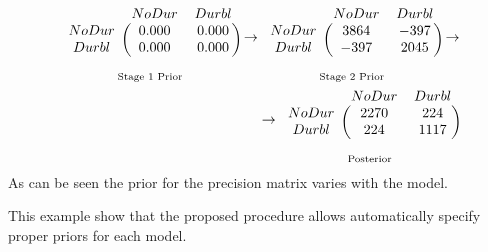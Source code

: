 \begin{eqnarray*}
\underset{\text{Stage 1 Prior}}
{\begin{blockarray}{ccc}
& NoDur & Durbl  \\ 
	\begin{block}{c(cc)}
	NoDur & 0.000 & 0.000 \\ 
	Durbl & 0.000 & 0.000 \\ 
	\end{block}
\end{blockarray} }
\rightarrow
\underset{\text{Stage 2 Prior}}
{\begin{blockarray}{ccc}
& NoDur & Durbl \\ 
	\begin{block}{c(cc)}
	NoDur & 3864 & -397 \\ 
	Durbl & -397 & 2045 \\
	\end{block}
\end{blockarray} }
\rightarrow \\
\rightarrow
\underset{\text{Posterior}}
{\begin{blockarray}{ccc}
& NoDur & Durbl \\ 
	\begin{block}{c(cc)}
	NoDur & 2270 & 224 \\ 
	Durbl & 224 & 1117 \\ 
	\end{block}
\end{blockarray}}
\end{eqnarray*}
As can be seen the prior for the precision matrix varies with the model.

This example show that the proposed procedure allows automatically specify proper priors for each model.

